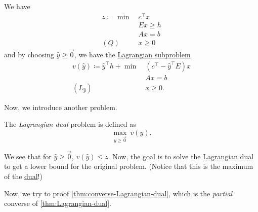 \begin{prev}
	We have
	\[
		\begin{aligned}
			z\coloneqq \min~ & c^{\top}x \\
			                 & Ex \geq h \\
			                 & Ax = b    \\
			(Q)\quad         & x\geq 0
		\end{aligned}
	\]
	and by choosing \(\hat{y}\geq \vec{0}\), we have the \hyperref[def:Lagrangian-subproblem]{Lagrangian subproblem}
	\[
		\begin{aligned}
			v(\hat{y})\coloneqq \hat{y}^{\top}h + \min~ & (c^{\top} - \hat{y}^{\top}E)x \\
			                                            & Ax = b                        \\
			(L_{\hat{y}})\quad                          & x\geq 0.
		\end{aligned}
	\]
\end{prev}

Now, we introduce another problem.

\begin{definition}\label{def:Lagrangian-dual}
	The \emph{Lagrangian dual} problem is defined as
	\[
		\max_{y\geq \vec{0}}\ v(y).
	\]
\end{definition}

\begin{note}
	We see that for \(\hat{y}\geq \vec{0}\), \(v(\hat{y})\leq z\). Now, the goal is to solve the \hyperref[def:Lagrangian-dual]{Lagrangian dual} to get a lower bound for the original problem. (Notice that this is the maximum of the \hyperref[def:dual]{dual}!)
\end{note}

Now, we try to proof \autoref{thm:converse-Lagrangian-dual}, which is the \emph{partial} converse of \autoref{thm:Lagrangian-dual}.

